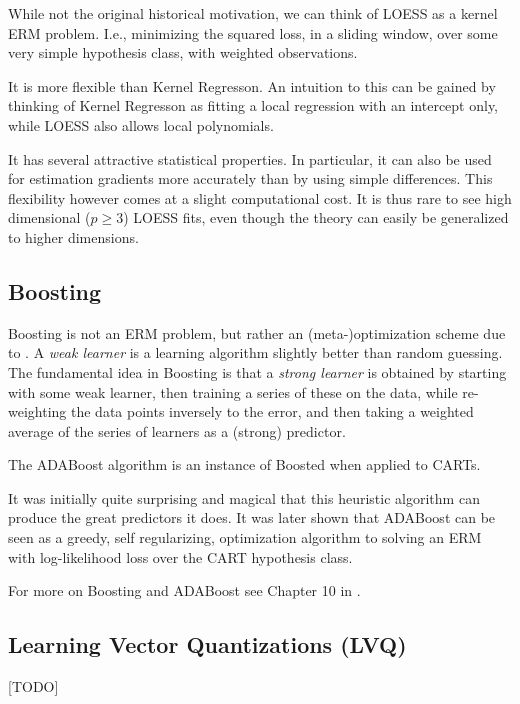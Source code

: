 While not the original historical motivation, we can think of LOESS as a kernel ERM problem. 
I.e., minimizing the squared loss, in a sliding window, over some very simple hypothesis class, with weighted observations.

It is more flexible than Kernel Regresson.
An intuition to this can be gained by thinking of Kernel Regresson as fitting a local regression with an intercept only, while LOESS also allows local polynomials.

It has several attractive statistical properties. In particular, it can also be used for estimation gradients more accurately than by using simple differences. 
This flexibility however comes at a slight computational cost. 
It is thus rare to see high dimensional ($p \geq 3$) LOESS fits, even though the theory can easily be generalized to higher dimensions.




\subsection{Boosting}
\label{sec:boosting}

Boosting is not an ERM problem, but rather an (meta-)optimization scheme due to \cite{schapire_strength_1990}.
A \emph{weak learner} is a learning algorithm slightly better than random guessing. 
The fundamental idea in Boosting is that a \emph{strong learner} is obtained by starting with some weak learner, then training a series of these on the data, while re-weighting the data points inversely to the error, and then taking a weighted average of the series of learners as a (strong) predictor.

The ADABoost algorithm \citep{freund_decision-theoretic_1997} is an instance of Boosted when applied to CARTs.

It was initially quite surprising and magical that this heuristic algorithm can produce the great predictors it does. 
It was later shown that ADABoost can be seen as a greedy, self regularizing, optimization algorithm to solving an ERM with log-likelihood loss \citep{friedman_additive_2000} over the CART hypothesis class.

For more on Boosting and ADABoost see Chapter 10 in \cite{hastie_elements_2003}.



\subsection{Learning Vector Quantizations (LVQ)}
[TODO]





